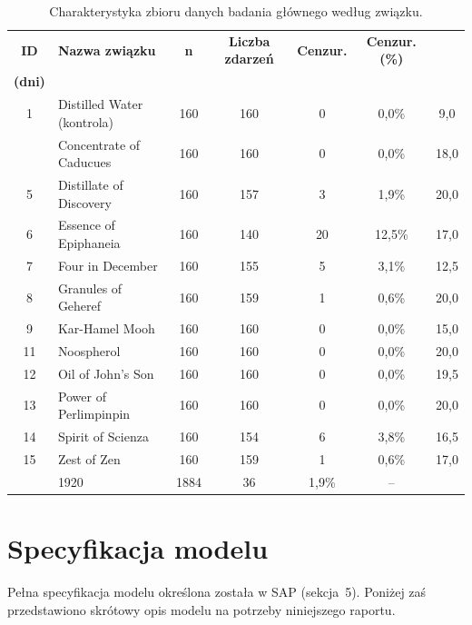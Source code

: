 \documentclass[12pt, a4paper]{article}
\begin{document}
\begin{table}[h!]
\centering
\footnotesize
\caption{Charakterystyka zbioru danych badania głównego według związku.}
\label{tab:desc_stats}
\begin{tabular}{clccccc}
\toprule
\textbf{ID} & \textbf{Nazwa związku} & \textbf{n} & \textbf{Liczba zdarzeń} & \textbf{Cenzur.} & \textbf{Cenzur. (\%)} & \thead{\textbf{Mediana KM} \\ \textbf{(dni)}} \\
\midrule
 1 & Distilled Water (kontrola)  & 160 & 160 &  0 &  0,0\% &  9,0 \\
\addlinespace
 4 & Concentrate of Caducues     & 160 & 160 &  0 &  0,0\% & 18,0 \\
 5 & Distillate of Discovery     & 160 & 157 &  3 &  1,9\% & 20,0 \\
 6 & Essence of Epiphaneia       & 160 & 140 & 20 & 12,5\% & 17,0 \\
 7 & Four in December            & 160 & 155 &  5 &  3,1\% & 12,5 \\
 8 & Granules of Geheref         & 160 & 159 &  1 &  0,6\% & 20,0 \\
 9 & Kar-Hamel Mooh              & 160 & 160 &  0 &  0,0\% & 15,0 \\
11 & Noospherol                  & 160 & 160 &  0 &  0,0\% & 20,0 \\
12 & Oil of John's Son           & 160 & 160 &  0 &  0,0\% & 19,5 \\
13 & Power of Perlimpinpin       & 160 & 160 &  0 &  0,0\% & 20,0 \\
14 & Spirit of Scienza           & 160 & 154 &  6 &  3,8\% & 16,5 \\
15 & Zest of Zen                 & 160 & 159 &  1 &  0,6\% & 17,0 \\
\addlinespace
\multicolumn{2}{l}{\textit{Łącznie}} & 1920 & 1884 &  36 &  1,9\% & -- \\
\bottomrule
\end{tabular}
\end{table}

\section{Specyfikacja modelu}
Pełna specyfikacja modelu określona została w SAP (sekcja~5). Poniżej zaś przedstawiono skrótowy opis modelu na potrzeby niniejszego raportu.
\end{document}

